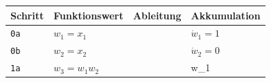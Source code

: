 \documentclass[
]{book}
\theoremstyle{definition}
\theoremstyle{definition}
\theoremstyle{definition}
\theoremstyle{definition}
\theoremstyle{remark}
\begin{document}
\begin{longtable}[]{@{}llll@{}}
\toprule
\begin{minipage}[b]{0.10\columnwidth}\raggedright
Schritt\strut
\end{minipage} & \begin{minipage}[b]{0.17\columnwidth}\raggedright
Funktionswert\strut
\end{minipage} & \begin{minipage}[b]{0.20\columnwidth}\raggedright
Ableitung\strut
\end{minipage} & \begin{minipage}[b]{0.41\columnwidth}\raggedright
Akkumulation\strut
\end{minipage}\tabularnewline
\midrule
\endhead
\begin{minipage}[t]{0.10\columnwidth}\raggedright
\texttt{0a}\strut
\end{minipage} & \begin{minipage}[t]{0.17\columnwidth}\raggedright
\(w_1=x_1\)\strut
\end{minipage} & \begin{minipage}[t]{0.20\columnwidth}\raggedright
\strut
\end{minipage} & \begin{minipage}[t]{0.41\columnwidth}\raggedright
\(\dot w_1 = 1\)\strut
\end{minipage}\tabularnewline
\begin{minipage}[t]{0.10\columnwidth}\raggedright
\texttt{0b}\strut
\end{minipage} & \begin{minipage}[t]{0.17\columnwidth}\raggedright
\(w_2=x_2\)\strut
\end{minipage} & \begin{minipage}[t]{0.20\columnwidth}\raggedright
\strut
\end{minipage} & \begin{minipage}[t]{0.41\columnwidth}\raggedright
\(\dot w_2 = 0\)\strut
\end{minipage}\tabularnewline
\begin{minipage}[t]{0.10\columnwidth}\raggedright
\texttt{1a}\strut
\end{minipage} & \begin{minipage}[t]{0.17\columnwidth}\raggedright
\(w_3 = w_1w_2\)\strut
\end{minipage} & \begin{minipage}[t]{0.20\columnwidth}\raggedright
\(\partial w_3 = \begin{bmatrix} w_2&w_1\end{bmatrix}\)\strut

\end{minipage}
\end{longtable}
\end{document}
